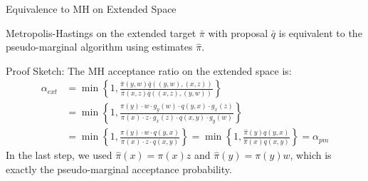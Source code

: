 \documentclass[aspectratio=169]{beamer}
\begin{document}
\begin{frame}{Equivalence to MH on Extended Space}
    \begin{theorem}[Equivalence]
Metropolis-Hastings on the extended target $\bar{\pi}$ with proposal $\bar{q}$ is equivalent to the pseudo-marginal algorithm using estimates $\hat{\pi}$.
\end{theorem}

Proof Sketch:
The MH acceptance ratio on the extended space is:
\begin{align*}
\alpha_{ext} &= \min\left\{1, \frac{\bar{\pi}(y,w)\bar{q}((y,w),(x,z))}{\bar{\pi}(x,z)\bar{q}((x,z),(y,w))}\right\}\\
&= \min\left\{1, \frac{\pi(y) \cdot w \cdot g_y(w) \cdot q(y,x) \cdot g_x(z)}{\pi(x) \cdot z \cdot g_x(z) \cdot q(x,y) \cdot g_y(w)}\right\}\\
&= \min\left\{1, \frac{\pi(y) \cdot w \cdot q(y,x)}{\pi(x) \cdot z \cdot q(x,y)}\right\}
= \min\left\{1, \frac{\hat{\pi}(y)q(y,x)}{\hat{\pi}(x)q(x,y)}\right\} = \alpha_{pm}
\end{align*}
In the last step, we used $\hat{\pi}(x) = \pi(x) z$ and $\hat{\pi}(y) = \pi(y) w$,
which is exactly the pseudo-marginal acceptance probability.

\end{frame}
\end{document}
